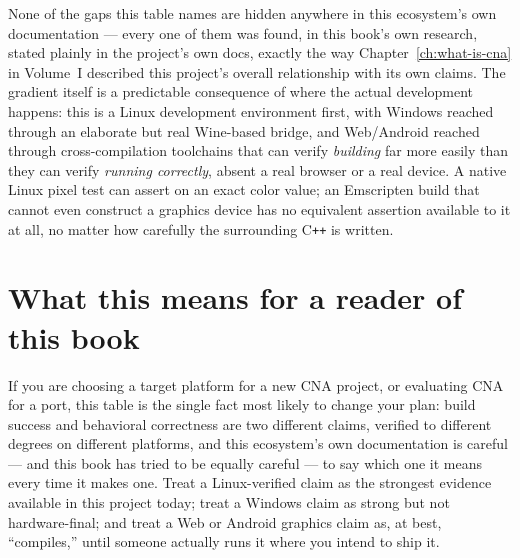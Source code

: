 None of the gaps this table names are hidden anywhere in this ecosystem's own documentation
--- every one of them was found, in this book's own research, stated plainly in the project's
own docs, exactly the way Chapter~\ref{ch:what-is-cna} in Volume~I described this project's
overall relationship with its own claims. The gradient itself is a predictable consequence of
where the actual development happens: this is a Linux development environment first, with
Windows reached through an elaborate but real Wine-based bridge, and Web/Android reached
through cross-compilation toolchains that can verify \emph{building} far more easily than
they can verify \emph{running correctly}, absent a real browser or a real device. A native
Linux pixel test can assert on an exact color value; an Emscripten build that cannot even
construct a graphics device has no equivalent assertion available to it at all, no matter how
carefully the surrounding C\texttt{++} is written.

\section{What this means for a reader of this book}

If you are choosing a target platform for a new CNA project, or evaluating CNA for a port,
this table is the single fact most likely to change your plan: build success and behavioral
correctness are two different claims, verified to different degrees on different platforms,
and this ecosystem's own documentation is careful --- and this book has tried to be equally
careful --- to say which one it means every time it makes one. Treat a Linux-verified claim as
the strongest evidence available in this project today; treat a Windows claim as strong but
not hardware-final; and treat a Web or Android graphics claim as, at best, ``compiles,'' until
someone actually runs it where you intend to ship it.
